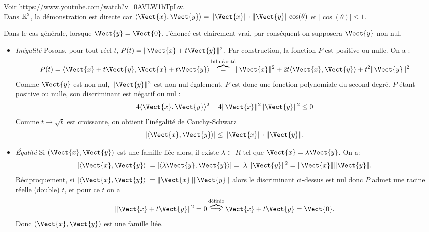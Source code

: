 \documentclass{book}
\begin{document}
\begin{Demonstration}
Voir \url{https://www.youtube.com/watch?v=0AVLW1bTpLw}.\\
Dans $\mathbb{R}^2$, la démonstration est directe car $\PS{\Vect{x}}{\Vect{y}}=\norme{\Vect{x}}\cdot \norme{\Vect{y}}\cos(\theta)$  et $|\cos(\theta)|\leq 1$.
\begin{center}
\end{center}
Dans le cas générale, lorsque $\Vect{y} =  \Vect{0}$, l'énoncé est clairement vrai, par conséquent on supposera $\Vect{y}$ non nul.
\begin{itemize}
\item \textit{Inégalité} Posons, pour tout réel $t$, $P(t)=\norme{\Vect{x}+t\Vect{y}}^{2}$. Par construction, la fonction $P$ est  positive ou nulle. On a :
$$P(t)= \PS{\Vect{x}+t\Vect{y}}{\Vect{x}+t\Vect{y}}\overbrace{=}^{\text{bilinéarité}} \norme{\Vect{x}}^2 +2t\PS{\Vect{x}}{\Vect{y}} +t^2  \norme{\Vect{y}}^2$$
Comme $\Vect{y}$ est non nul, $\norme{\Vect{y}}^2$ est non nul également.  $P$ est donc une fonction polynomiale du second degré. $P$ étant positive ou nulle, son discriminant est négatif ou nul  :
$$4\PS{ \Vect{x}}{\Vect{y}}^{2}-4\norme{\Vect{x}}^{2}\norme{\Vect{y}}^{2}\leq 0 $$
Comme $t\to\sqrt{t}$ est croissante, on obtient l'inégalité de Cauchy-Schwarz
\[ | \PS{\Vect{x}}{\Vect{y}} | \leq  \norme{\Vect{x}}\cdot \norme{\Vect{y}}. \]
\item \textit{Égalité} Si $(\Vect{x}, \Vect{y})$ est une famille liée alors, il existe $\lambda\in\ R$ tel que $\Vect{x} = \lambda\Vect{y}$. On a:
$$|\PS{\Vect{x}}{\Vect{y}}|=|\PS{\lambda\Vect{y}}{\Vect{y}}|=|\lambda| \norme{\Vect{y}}^{2}=\norme{\Vect{x}}\norme{\Vect{y}}.$$
Réciproquement, si $|\PS{\Vect{x}}{\Vect{y}}| = \norme{\Vect{x}}\norme{\Vect{y}}$ alors le discriminant ci-dessus est nul donc $P$ admet une racine réelle (double) $t$, et pour ce $t$ on a
$$ \norme{\Vect{x}+t\Vect{y}}^{2}=0\overbrace{\Longrightarrow}^{\text{définie}} \Vect{x}+t\Vect{y} =\Vect{0}.$$
Donc $(\Vect{x}, \Vect{y})$ est une famille liée.
\end{itemize} 
\end{Demonstration}
\end{document}
